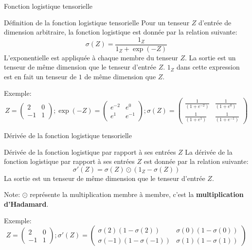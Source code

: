 \begin{frame}{Fonction logistique tensorielle}
	\begin{block}{Définition de la fonction logistique tensorielle}
		Pour un tenseur $Z$ d'entrée de dimension arbitraire, la fonction logistique est donnée par la relation suivante:
		\begin{equation*}
			\sigma(Z) = \frac{1_Z}{1_Z + \exp{(-Z)}}
		\end{equation*}
		L'exponentielle est appliquée à chaque membre du tenseur $Z$. La sortie est un tenseur de même dimension que le tenseur d'entrée $Z$. $1_Z$ dans cette expression est en fait un tenseur de $1$ de même dimension que $Z$.
	\end{block}
	Exemple:
	\begin{equation*}
		Z = \begin{pmatrix}
			2 & 0 \\
			-1 & 1 
		\end{pmatrix}; 
		\exp{(-Z)} = \begin{pmatrix}
			e^{-2} & e^{0} \\
			e^{1} & e^{-1} 
		\end{pmatrix};
		\sigma(Z) = \begin{pmatrix}
			\frac{1}{\left(1 + e^{-2}\right)} & \frac{1}{\left(1 + e^{0}\right)} \\
			\frac{1}{\left(1 + e^{1}\right)}  & \frac{1}{\left(1 + e^{-1}\right)}
		\end{pmatrix}
	\end{equation*}
\end{frame}

\begin{frame}{Dérivée de la fonction logistique tensorielle}	
	\begin{block}{Dérivée de la fonction logistique par rapport à ses entrées $Z$}
		La dérivée de la fonction logistique par rapport à ses entrées $Z$ est donnée par la relation suivante:
		\begin{equation*}
			\sigma'(Z) = \sigma(Z) \odot \left(1_Z - \sigma(Z)\right)
		\end{equation*}
		La sortie est un tenseur de même dimension que le tenseur d'entrée $Z$.
	\end{block}
	Note: $\odot$ représente la multiplication membre à membre, c'est la \textbf{multiplication d'Hadamard}.
	
	Exemple:
	\begin{equation*}
		Z = \begin{pmatrix}
			2 & 0 \\
			-1 & 1 
		\end{pmatrix}; 
		\sigma'(Z) = \begin{pmatrix}
			\sigma(2) (1 - \sigma(2)) & \sigma(0) (1 - \sigma(0)) \\
			\sigma(-1) (1 - \sigma(-1)) & \sigma(1) (1 - \sigma(1))
		\end{pmatrix}
	\end{equation*}	
\end{frame}

